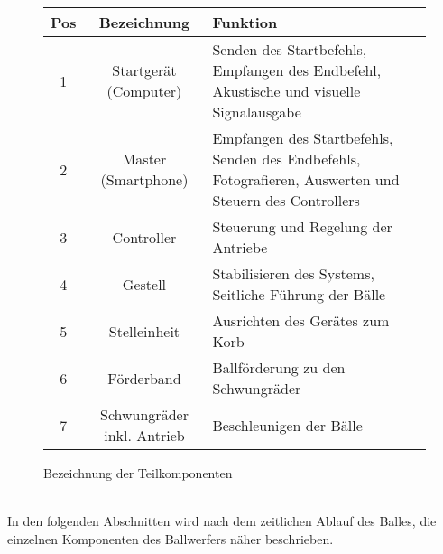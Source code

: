 \begin{figure}[h!]
	\begin{tabular}{|c|c|p{7.5cm}|}
		\hline \textbf{Pos} & \textbf{Bezeichnung} & \textbf{Funktion} \\ 
		\hline 1 & Startgerät (Computer) & Senden des Startbefehls, Empfangen des Endbefehl, Akustische und visuelle Signalausgabe
		\\ 
		\hline 2 & Master  (Smartphone) & Empfangen des Startbefehls, Senden des Endbefehls,
		Fotografieren, Auswerten und Steuern des Controllers
		\\ 
		\hline 3 & Controller & Steuerung und Regelung der Antriebe \\ 
		\hline 4 & Gestell & Stabilisieren des Systems,
		Seitliche Führung der Bälle
		\\ 
		\hline 5 & Stelleinheit & Ausrichten des Gerätes zum Korb \\ 
		\hline 6 & Förderband & Ballförderung zu den Schwungräder \\ 
		\hline 7 & Schwungräder inkl. Antrieb & Beschleunigen der Bälle \\ 
		\hline 
	\end{tabular} 
	\centering
	\caption{Bezeichnung der Teilkomponenten}	
	\label{tab:BezTeilkomponenten}
\end{figure}\\
In den folgenden Abschnitten wird nach dem zeitlichen Ablauf des Balles, die einzelnen Komponenten des Ballwerfers näher beschrieben. 